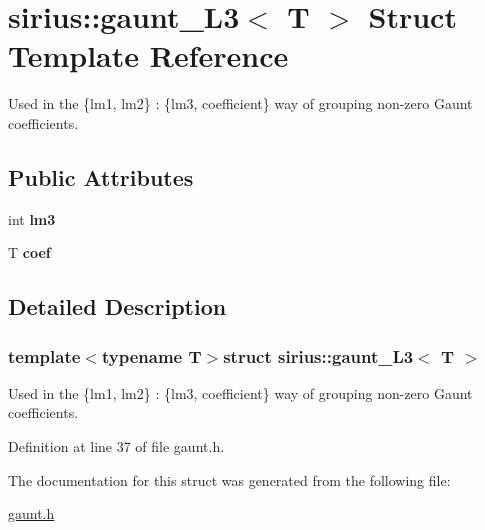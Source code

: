\hypertarget{structsirius_1_1gaunt___l3}{}\section{sirius\+:\+:gaunt\+\_\+\+L3$<$ T $>$ Struct Template Reference}
\label{structsirius_1_1gaunt___l3}


Used in the \{lm1, lm2\} \+: \{lm3, coefficient\} way of grouping non-\/zero Gaunt coefficients.  


\subsection*{Public Attributes}
\begin{DoxyCompactItemize}
\item 
\hypertarget{structsirius_1_1gaunt___l3_aefa090a1d23ee2415a6ab70635ac17ed}{}int {\bfseries lm3}\label{structsirius_1_1gaunt___l3_aefa090a1d23ee2415a6ab70635ac17ed}

\item 
\hypertarget{structsirius_1_1gaunt___l3_a9b1a825f8be6e35a9299e0523bd6ef03}{}T {\bfseries coef}\label{structsirius_1_1gaunt___l3_a9b1a825f8be6e35a9299e0523bd6ef03}

\end{DoxyCompactItemize}


\subsection{Detailed Description}
\subsubsection*{template$<$typename T$>$struct sirius\+::gaunt\+\_\+\+L3$<$ T $>$}

Used in the \{lm1, lm2\} \+: \{lm3, coefficient\} way of grouping non-\/zero Gaunt coefficients. 

Definition at line 37 of file gaunt.\+h.



The documentation for this struct was generated from the following file\+:\begin{DoxyCompactItemize}
\item 
\hyperlink{gaunt_8h}{gaunt.\+h}\end{DoxyCompactItemize}
